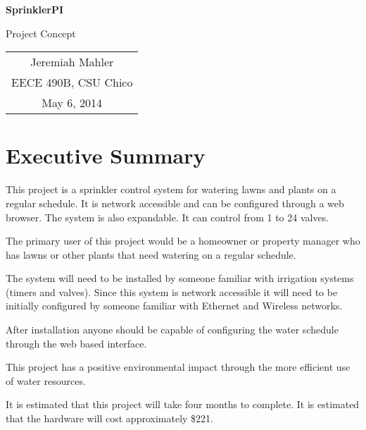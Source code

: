 \documentclass[12pt,letterpaper]{article}
\begin{document}
\vspace*{1.0in}

\centerline{\LARGE \textbf{SprinklerPI}}
\vspace{0.3in}
\centerline{\LARGE Project Concept}

\vfill

\begin{center}
\begin{tabular}{c}
Jeremiah Mahler \\
EECE 490B, CSU Chico \\
May 6, 2014
\end{tabular}
\end{center}

\vspace{2in}

\thispagestyle{empty}

\pagebreak

\tableofcontents
{}
\pagebreak

\pagebreak
\section{Executive Summary}

This project is a sprinkler control system for watering lawns and plants
on a regular schedule.
It is network accessible and can be configured through a web browser.
The system is also expandable.
It can control from 1 to 24 valves.

The primary user of this project would be a homeowner or property
manager who has lawns or other plants that need watering on a
regular schedule.

The system will need to be installed by someone familiar with
irrigation systems (timers and valves).
Since this system is network accessible it will need to be initially
configured by someone familiar with Ethernet and Wireless networks.

After installation anyone should be capable of configuring the
water schedule through the web based interface.

This project has a positive environmental impact through the more efficient
use of water resources.

It is estimated that this project will take four months to complete.
It is estimated that the hardware will cost approximately \$221.

\end{document}

